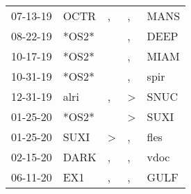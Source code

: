 \begin{supertabular}{p{0.07\textwidth}p{0.06\textwidth}p{0.02\textwidth}p{0.02\textwidth}p{0.06\textwidth}}
          07-13-19\textsuperscript{} &           OCTR\textsuperscript{} &                , &                , &           MANS\textsuperscript{} \\
          08-22-19\textsuperscript{} &                            *OS2* &                  &                , &           DEEP\textsuperscript{} \\
          10-17-19\textsuperscript{} &                            *OS2* &                  &                , &           MIAM\textsuperscript{} \\
          10-31-19\textsuperscript{} &                            *OS2* &                  &                , &           spir\textsuperscript{} \\
          12-31-19\textsuperscript{} &           alri\textsuperscript{} &                , &     \textgreater &           SNUC\textsuperscript{} \\
          01-25-20\textsuperscript{} &                            *OS2* &                  &     \textgreater &           SUXI\textsuperscript{} \\
          01-25-20\textsuperscript{} &           SUXI\textsuperscript{} &     \textgreater &                , &           fles\textsuperscript{} \\
          02-15-20\textsuperscript{} &           DARK\textsuperscript{} &                , &                , &           vdoc\textsuperscript{} \\
          06-11-20\textsuperscript{} &            EX1\textsuperscript{} &                , &                , &           GULF\textsuperscript{} \\
\end{supertabular}
